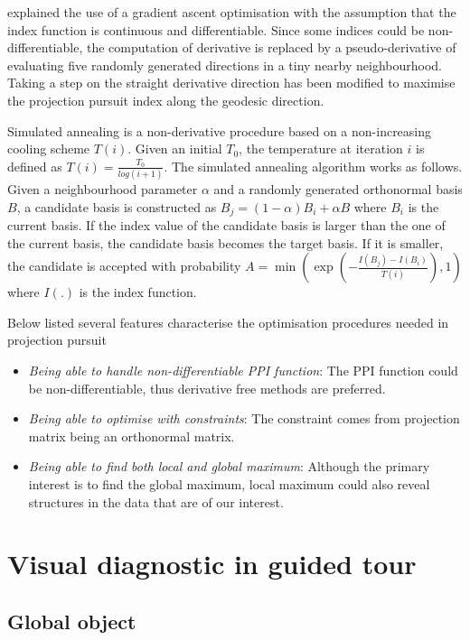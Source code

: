 \documentclass[12pt]{article}
\begin{document}
\citet{cook1995grand} explained the use of a gradient ascent
optimisation with the assumption that the index function is continuous
and differentiable. Since some indices could be non-differentiable, the
computation of derivative is replaced by a pseudo-derivative of
evaluating five randomly generated directions in a tiny nearby
neighbourhood. Taking a step on the straight derivative direction has
been modified to maximise the projection pursuit index along the
geodesic direction.

Simulated annealing
\citep[\citet{kirkpatrick1983optimization}]{bertsimas1993simulated} is a
non-derivative procedure based on a non-increasing cooling scheme
\(T(i)\). Given an initial \(T_0\), the temperature at iteration \(i\)
is defined as \(T(i) = \frac{T_0}{log(i + 1)}\). The simulated annealing
algorithm works as follows. Given a neighbourhood parameter \(\alpha\)
and a randomly generated orthonormal basis \(B\), a candidate basis is
constructed as \(B_j = (1- \alpha)B_i + \alpha B\) where \(B_i\) is the
current basis. If the index value of the candidate basis is larger than
the one of the current basis, the candidate basis becomes the target
basis. If it is smaller, the candidate is accepted with probability
\(A = \min \left(\exp(-\frac{I(B_j) - I(B_i)}{T(i)}), 1 \right)\) where
\(I(.)\) is the index function.

Below listed several features characterise the optimisation procedures
needed in projection pursuit

\begin{itemize}
\item
  \emph{Being able to handle non-differentiable PPI function}: The PPI
  function could be non-differentiable, thus derivative free methods are
  preferred.
\item
  \emph{Being able to optimise with constraints}: The constraint comes
  from projection matrix being an orthonormal matrix.
\item
  \emph{Being able to find both local and global maximum}: Although the
  primary interest is to find the global maximum, local maximum could
  also reveal structures in the data that are of our interest.
\end{itemize}

\hypertarget{apply}{%
\section{Visual diagnostic in guided tour}\label{apply}}

\hypertarget{global-object-1}{%
\subsection{Global object}\label{global-object-1}}
\end{document}
